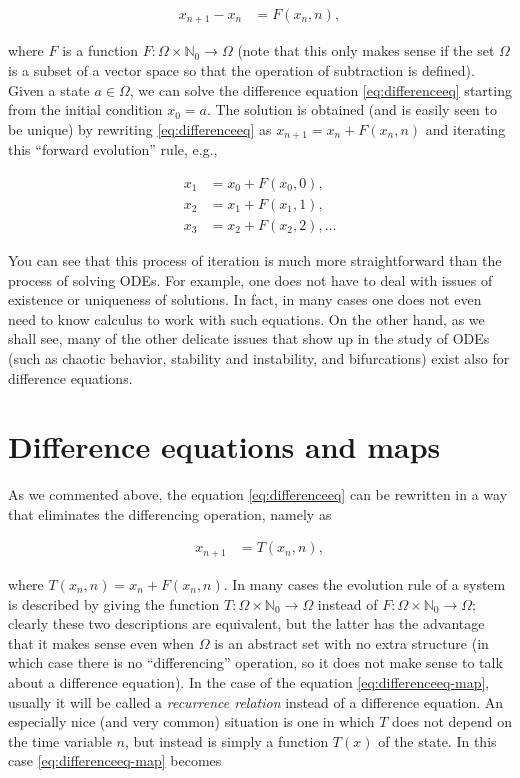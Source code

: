 \documentclass[11pt]{report}
\theoremstyle{plain}
\theoremstyle{definition}
\begin{document}
\begin{equation*} \tag{29}\label{eq:differenceeq}
\begin{split}
x_{n+1}-x_n &= F(x_n, n),
\end{split}
\end{equation*}

\noindent where $F$ is a function
$F:\Omega\times \mathbb{N}_0\to\Omega$ (note that this
only makes sense if the set $\Omega$ is a subset of a
vector space so that the operation of subtraction is
defined). Given a state $a \in \Omega$, we can solve
the difference equation \eqref{eq:differenceeq} starting
from the initial condition $x_0=a$. The solution is
obtained (and is easily seen to be unique) by
rewriting \eqref{eq:differenceeq} as
$x_{n+1}=x_n+F(x_n,n)$ and iterating this ``forward
evolution'' rule, e.g.,

\begin{align*}
x_1 &= x_0 + F(x_0,0), \\ x_2&= x_1+F(x_1,1), \\ x_3&=x_2+F(x_2,2), \ldots
\end{align*}

\noindent You can see that this process of iteration is much
more straightforward than the process of solving ODEs.
For example, one does not have to deal with issues of
existence or uniqueness of solutions. In fact, in many
cases one does not even need to know calculus to work
with such equations. On the other hand, as we shall
see, many of the other delicate issues that show up in
the study of ODEs (such as chaotic behavior, stability
and instability, and bifurcations) exist also for
difference equations.

\section{Difference equations and maps}

As we commented above, the equation
\eqref{eq:differenceeq} can be rewritten in a way that
eliminates the differencing operation, namely as

\begin{equation*} \tag{30}\label{eq:differenceeq-map}
\begin{split}
x_{n+1} &= T(x_n,n),
\end{split}
\end{equation*}

\noindent where $T(x_n,n)=x_n+F(x_n,n)$. In many cases the
evolution rule of a system is described by giving the
function $T:\Omega\times \mathbb{N}_0\to\Omega$
instead of $F:\Omega\times \mathbb{N}_0\to\Omega$;
clearly these two descriptions are equivalent, but the
latter has the advantage that it makes sense even when
$\Omega$ is an abstract set with no extra structure
(in which case there is no ``differencing'' operation,
so it does not make sense to talk about a difference
equation). In the case of the equation
\eqref{eq:differenceeq-map}, usually it will be called a
\emph{recurrence relation} instead of a difference
equation. An especially nice (and very common)
situation is one in which $T$ does not depend on the
time variable $n$, but instead is simply a function
$T(x)$ of the state. In this case
\eqref{eq:differenceeq-map} becomes
\end{document}
